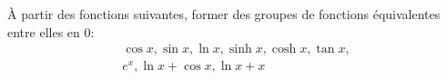  {\`A} partir des fonctions suivantes, former des groupes de
fonctions {\'e}quivalentes entre elles en 0:
\begin{multline*}
\cos x, \sin x, \ln x, \sinh x, \cosh x, \tan x,\\
e^x, \ln x + \cos x, \ln x + x  
\end{multline*}

\bigskip\bigskip\bigskip\bigskip 